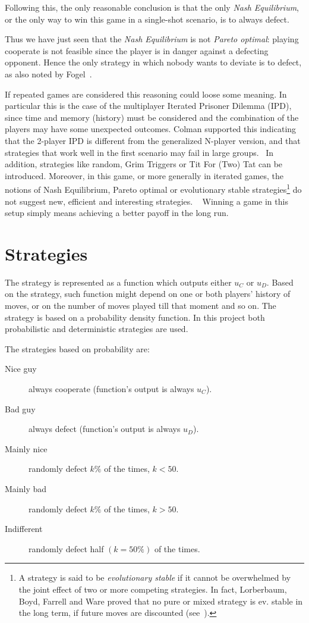 \documentclass[journal,10pt,twoside]{IEEEtran}
\begin{document}
Following this, the only reasonable conclusion is that the only \textit{Nash Equilibrium}, or the only way to win this game in a single-shot scenario, is to always defect.

Thus we have just seen that the \textit{Nash Equilibrium} is not \textit{Pareto optimal}: playing cooperate is not feasible since the player is in danger against a defecting opponent. Hence the only strategy in which nobody wants to deviate is to defect, as also noted by Fogel~\cite{fogelEvolvingBehaviors}.

If repeated games are considered this reasoning could loose some meaning. In particular this is the case of the multiplayer Iterated Prisoner Dilemma (IPD), since time and memory (history) must be considered and the combination of the players may have some unexpected outcomes.
Colman supported this indicating that the 2-player IPD is different from the generalized N-player version, and that strategies that work well in the first scenario may fail in large groups.~\cite{yao1994experimental}
In addition, strategies like random, Grim Triggers or Tit For (Two) Tat can be introduced.
Moreover, in this game, or more generally in iterated games, the notions of Nash Equilibrium, Pareto optimal or evolutionary stable strategies\footnote{A strategy is said to be \textit{evolutionary stable} if it cannot be overwhelmed by the joint effect of two or more competing strategies. In fact, Lorberbaum, Boyd, Farrell and Ware proved that no pure or mixed strategy is ev. stable in the long term, if future moves are discounted (see~\cite{lorb94}).} do not suggest new, efficient and interesting strategies. ~\cite{mathieu2017}
Winning a game in this setup simply means achieving a better payoff in the long run.

\section{Strategies} \label{s:str}
The strategy is represented as a function which outputs either $u_C$ or $u_D$. Based on the strategy, such function might depend on one or both players' history of moves, or on the number of moves played till that moment and so on.
The strategy is based on a probability density function. In this project both probabilistic and deterministic strategies are used.

The strategies based on probability are:
\begin{description}
    \item[Nice guy] always cooperate (function's output is always $u_C$).
    \item[Bad guy] always defect (function's output is always $u_D$).
    \item[Mainly nice] randomly defect $k\%$ of the times, $k<50$.%
    \item[Mainly bad] randomly defect $k\%$ of the times, $k>50$.%
    \item[Indifferent] randomly defect half $(k=50\%)$ of the times.
\end{description}
\end{document}
